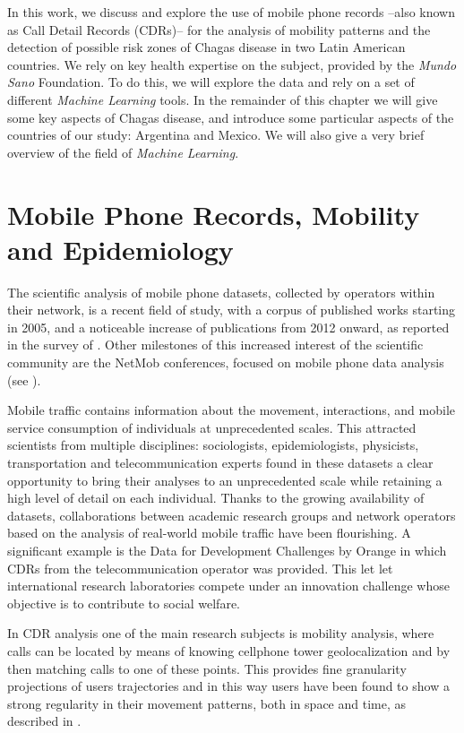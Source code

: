 In this work, we discuss and explore the use of mobile phone records --also known as Call Detail Records (CDRs)-- for the analysis of mobility patterns and the detection of possible risk zones of Chagas disease in two Latin American countries.
We rely on key health expertise on the subject, provided by the \textit{Mundo Sano} Foundation.
To do this, we will explore the data and rely on a set of different \textit{Machine Learning} tools.
In the remainder of this chapter we will give some key aspects of Chagas disease, and introduce some particular aspects of the countries of our study: Argentina and Mexico.
We will also give a very brief overview of the field of \textit{Machine Learning}.


\section{Mobile Phone Records, Mobility and Epidemiology}

The scientific analysis of mobile phone datasets, collected by operators within their network, is a recent field of study, with a corpus of published works starting in 2005, and a noticeable increase of publications from 2012 onward, as reported in the survey of \citep{naboulsi2015mobile}.
Other milestones of this increased interest of the scientific community are the NetMob conferences, focused on mobile phone data analysis (see \citep{netmob}).

Mobile traffic contains information about the movement, interactions, and mobile service consumption of individuals at unprecedented scales.
This attracted scientists from multiple disciplines:
sociologists, epidemiologists, physicists, transportation and telecommunication experts found in these datasets a clear opportunity to bring their analyses to an unprecedented scale while retaining a high level of detail on each individual.
Thanks to the growing availability of datasets, collaborations between academic research groups and network operators based on the analysis of real-world mobile traffic have been flourishing.
A significant example is the Data for Development Challenges by Orange \citep{d4d} in which CDRs from the telecommunication operator was provided.
This let let international research laboratories compete under an innovation challenge whose objective is to contribute to social welfare.

In CDR analysis one of the main research subjects is mobility analysis, where calls can be located by means of knowing cellphone tower geolocalization and by then matching calls to one of these points.
This provides fine granularity projections of users trajectories and in this way users have been found to show a strong regularity in their movement patterns, both in space and time, as described in \citep{gonzalez2008understanding}.


